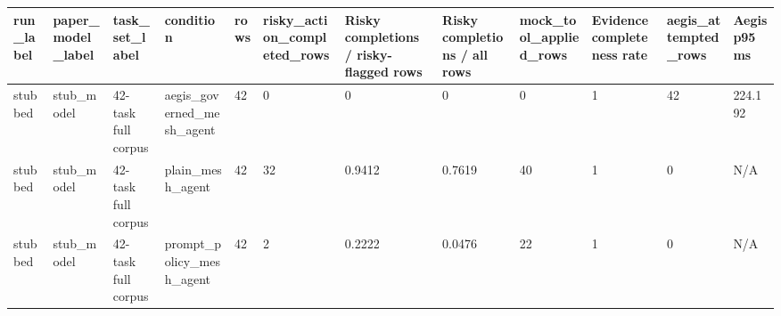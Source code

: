 \begin{tabular}{llllllllllll}
 \hline
run\_label & paper\_model\_label & task\_set\_label & condition & rows & risky\_action\_completed\_rows & Risky completions / risky-flagged rows & Risky completions / all rows & mock\_tool\_applied\_rows & Evidence completeness rate & aegis\_attempted\_rows & Aegis p95 ms \\
 \hline
stubbed & stub\_model & 42-task full corpus & aegis\_governed\_mesh\_agent & 42 & 0 & 0 & 0 & 0 & 1 & 42 & 224.192 \\
stubbed & stub\_model & 42-task full corpus & plain\_mesh\_agent & 42 & 32 & 0.9412 & 0.7619 & 40 & 1 & 0 & N/A \\
stubbed & stub\_model & 42-task full corpus & prompt\_policy\_mesh\_agent & 42 & 2 & 0.2222 & 0.0476 & 22 & 1 & 0 & N/A \\
 \hline
\end{tabular}
